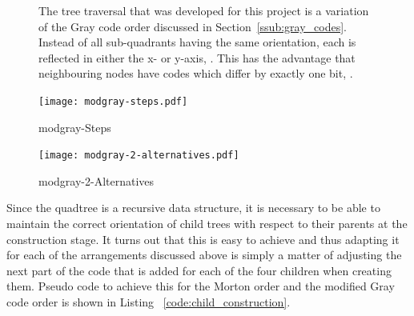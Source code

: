 \begin{figure}[tbhp]
\begin{subfigure}[c]{0.55\linewidth}
        \caption{}\label{fig:modgray-2-levels-numbers.pdf}
    \end{subfigure}
    \caption{The tree traversal that was developed for this project is a
    	variation of the Gray code order discussed in
    	Section~\ref{ssub:gray_codes}.  Instead of all sub-quadrants having the
    	same orientation, each is reflected in either the x- or y-axis,
    	. This has the advantage that
		neighbouring nodes have codes which differ by exactly one bit,
		.} \label{fig:modgray-traversal}
\end{figure}

\begin{figure}[tbhp]
	\centering
	\texttt{[image: modgray-steps.pdf]}
	\caption{modgray-Steps}
	\label{fig:modgray-steps}
\end{figure}

\begin{figure}[tbhp]
	\centering
	\texttt{[image: modgray-2-alternatives.pdf]}
	\caption{modgray-2-Alternatives}
	\label{fig:modgray-2-alternatives}
\end{figure}

Since the quadtree is a recursive data structure, it is necessary to be able
to maintain the correct orientation of child trees with respect to their
parents at the construction stage. It turns out that this is easy to achieve
and thus adapting it for each of the arrangements discussed above is simply a
matter of adjusting the next part of the code that is added for each of the
four children when creating them. Pseudo code to achieve this for the Morton
order and the modified Gray code order is shown in Listing
~\ref{code:child_construction}.

